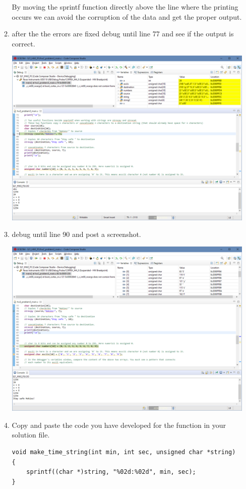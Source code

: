 \documentclass{article}
\begin{document}
\begin{enumerate}
\begin{enumerate}
\begin{center}
        By moving the sprintf function directly above the line where the printing occurs we can avoid the corruption of the data and get the proper output.
        \end{center}
        \newpage
        \item after the the errors are fixed debug until line 77 and see if the output is correct.
        \begin{center}
            \includegraphics[width = .9\textwidth]{3m.png}
        \end{center}
        \newpage
        \item debug until line 90 and post a screenshot.
        \begin{center}
            \includegraphics[width = .9\textwidth]{3n.png}
        \end{center}
        \addtocounter{enumii}{6}
        \newpage
        \item Copy and paste the code you have developed for the function in your solution file.
        \lstset{language=C}
        \lstset{frame=lines}
        \lstset{basicstyle=\footnotesize}
        \begin{lstlisting}
void make_time_string(int min, int sec, unsigned char *string) {
    sprintf((char *)string, "%02d:%02d", min, sec);
}
        \end{lstlisting}
    \end{enumerate}
\end{enumerate}
\end{document}
